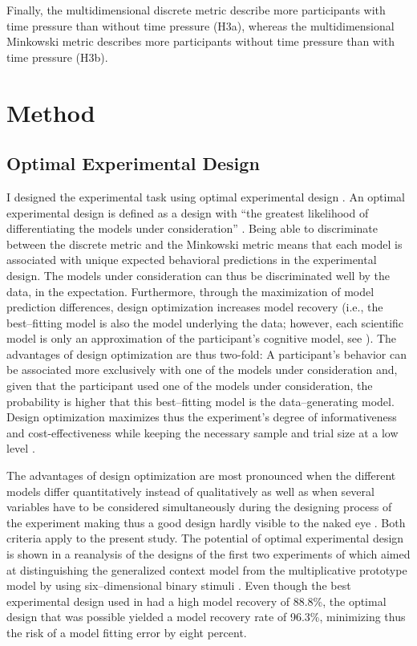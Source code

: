\documentclass[a4paper,man,natbib]{apa6}
\begin{document}
Finally, the multidimensional discrete metric describe more participants with time pressure than without time pressure (H3a), whereas the multidimensional Minkowski metric describes more participants without time pressure than with time pressure (H3b).

\section{Method}

\subsection{Optimal Experimental Design}
I designed the experimental task using optimal experimental design \citep{myung2009optimal}. An optimal experimental design is defined as a design with ``the greatest likelihood of differentiating the models under consideration'' \cite[][p. 500]{myung2009optimal}. Being able to discriminate between the discrete metric and the Minkowski metric means that each model is associated with unique expected behavioral predictions in the experimental design. The models under consideration can thus be discriminated well by the data, in the expectation. Furthermore, through the maximization of model prediction differences, design optimization increases model recovery (i.e., the best--fitting model is also the model underlying the data; however, each scientific model is only an approximation of the participant's cognitive model, see \citealp{myung2009optimal}). The advantages of design optimization are thus two-fold: A participant's behavior can be associated more exclusively with one of the models under consideration and, given that the participant used one of the models under consideration, the probability is higher that this best--fitting model is the data--generating model. Design optimization maximizes thus the experiment's degree of informativeness and cost-effectiveness while keeping the necessary sample and trial size at a low level \citep{cavagnaro2009better, ouyang2016practical, raffert2012optimally, atkinson2007optimum, nelson2005finding}. 

The advantages of design optimization are most pronounced when the different models differ quantitatively instead of qualitatively as well as when several variables have to be considered simultaneously during the designing process of the experiment making thus a good design hardly visible to the naked eye \citep{myung2009optimal}. Both criteria apply to the present study.
The potential of optimal experimental design is shown in a reanalysis of the designs of the first two experiments of \cite{smith1998prototypes} which aimed at distinguishing the generalized context model \citep{nosofsky1986attention} from the multiplicative prototype model \citep{smith1998prototypes} by using six--dimensional binary stimuli \citep{myung2009optimal}. Even though the best experimental design used in \citeauthor{smith1998prototypes} had a high model recovery of 88.8\%, the optimal design that was possible yielded a model recovery rate of 96.3\%, minimizing thus the risk of a model fitting error by eight percent.  
\end{document}
